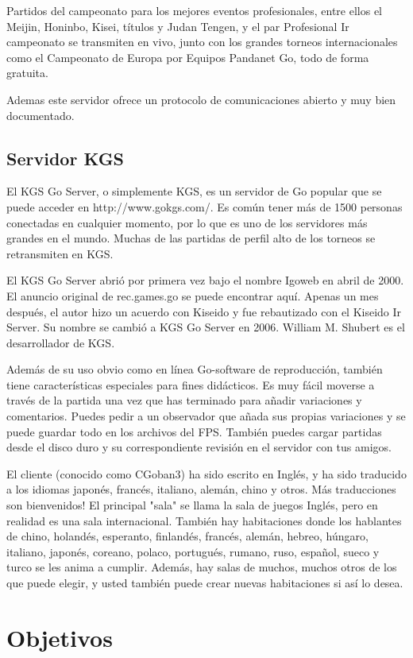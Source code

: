 \documentclass[12pt,a4paper]{report}
\begin{document}
Partidos del campeonato para los mejores eventos profesionales, entre ellos el Meijin, Honinbo, Kisei, títulos y Judan Tengen, y el par Profesional Ir campeonato se transmiten en vivo, junto con los grandes torneos internacionales como el Campeonato de Europa por Equipos Pandanet Go, todo de forma gratuita.

Ademas este servidor ofrece un protocolo de comunicaciones abierto y muy bien documentado.

\section{Servidor KGS}
El KGS Go Server, o simplemente KGS, es un servidor de Go popular que se puede acceder en http://www.gokgs.com/. Es común tener más de 1500 personas conectadas en cualquier momento, por lo que es uno de los servidores más grandes en el mundo. Muchas de las partidas de perfil alto de los torneos se retransmiten en KGS.

El KGS Go Server abrió por primera vez bajo el nombre Igoweb en abril de 2000. El anuncio original de rec.games.go se puede encontrar aquí. Apenas un mes después, el autor hizo un acuerdo con Kiseido y fue rebautizado con el Kiseido Ir Server. Su nombre se cambió a KGS Go Server en 2006. William M. Shubert es el desarrollador de KGS.

Además de su uso obvio como en línea Go-software de reproducción, también tiene características especiales para fines didácticos. Es muy fácil moverse a través de la partida una vez que has terminado para añadir variaciones y comentarios. Puedes pedir a un observador que añada sus propias variaciones y se puede guardar todo en los archivos del FPS. También puedes cargar partidas desde el disco duro y su correspondiente revisión en el servidor con tus amigos.

El cliente (conocido como CGoban3) ha sido escrito en Inglés, y ha sido traducido a los idiomas japonés, francés, italiano, alemán, chino y otros. Más traducciones son bienvenidos! El principal "sala" se llama la sala de juegos Inglés, pero en realidad es una sala internacional. También hay habitaciones donde los hablantes de chino, holandés, esperanto, finlandés, francés, alemán, hebreo, húngaro, italiano, japonés, coreano, polaco, portugués, rumano, ruso, español, sueco y turco se les anima a cumplir. Además, hay salas de muchos, muchos otros de los que puede elegir, y usted también puede crear nuevas habitaciones si así lo desea.

\chapter{Objetivos}
\end{document}
